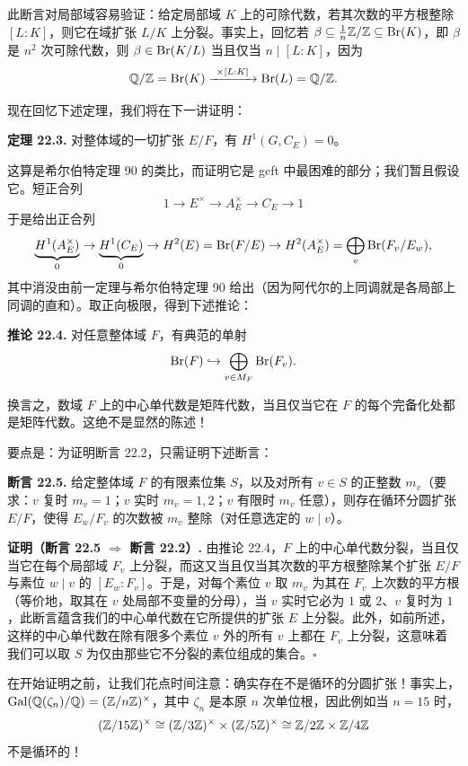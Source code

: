此断言对局部域容易验证：给定局部域 $K$ 上的可除代数，若其次数的平方根整除 $[L:K]$，则它在域扩张 $L/K$ 上分裂。事实上，回忆若 $\beta\subseteq\frac1n\mathbb{Z}/\mathbb{Z}\subseteq\operatorname{Br}(K)$，即 $\beta$ 是 $n^2$ 次可除代数，则 $\beta\in\operatorname{Br}(K/L)$ 当且仅当 $n\mid[L:K]$，因为
\[
\Q/\Z=\Br(K)\xrightarrow{\ \times[L:K]\ }\Br(L)=\Q/\Z.
\]

现在回忆下述定理，我们将在下一讲证明：

\textbf{定理 22.3.} 对整体域的一切扩张 $E/F$，有 $H^1(G,C_E)=0$。

这算是希尔伯特定理 90 的类比，而证明它是 gcft 中最困难的部分；我们暂且假设它。短正合列
\[
1\to E^\times\to A_E^\times\to C_E\to 1
\]
于是给出正合列
\[
\underbrace{H^1(A_E^\times)}_{0}\to\underbrace{H^1(C_E)}_{0}\to H^2(E)=\operatorname{Br}(F/E)\to H^2(A_E^\times)=\bigoplus_v\operatorname{Br}(F_v/E_w),
\]
其中消没由前一定理与希尔伯特定理 90 给出（因为阿代尔的上同调就是各局部上同调的直和）。取正向极限，得到下述推论：

\textbf{推论 22.4.} 对任意整体域 $F$，有典范的单射
\[
\operatorname{Br}(F)\hookrightarrow\bigoplus_{v\in M_F}\operatorname{Br}(F_v).
\]

换言之，数域 $F$ 上的中心单代数是矩阵代数，当且仅当它在 $F$ 的每个完备化处都是矩阵代数。这绝不是显然的陈述！

要点是：为证明断言 22.2，只需证明下述断言：

\textbf{断言 22.5.} 给定整体域 $F$ 的有限素位集 $S$，以及对所有 $v\in S$ 的正整数 $m_v$（要求：$v$ 复时 $m_v=1$；$v$ 实时 $m_v=1,2$；$v$ 有限时 $m_v$ 任意），则存在循环分圆扩张 $E/F$，使得 $E_w/F_v$ 的次数被 $m_v$ 整除（对任意选定的 $w\mid v$）。

\textbf{证明（断言 22.5 $\Rightarrow$ 断言 22.2）.} 由推论 22.4，$F$ 上的中心单代数分裂，当且仅当它在每个局部域 $F_v$ 上分裂，而这又当且仅当其次数的平方根整除某个扩张 $E/F$ 与素位 $w\mid v$ 的 $[E_w:F_v]$。于是，对每个素位 $v$ 取 $m_v$ 为其在 $F_v$ 上次数的平方根（等价地，取其在 $v$ 处局部不变量的分母），当 $v$ 实时它必为 $1$ 或 $2$、$v$ 复时为 $1$，此断言蕴含我们的中心单代数在它所提供的扩张 $E$ 上分裂。此外，如前所述，这样的中心单代数在除有限多个素位 $v$ 外的所有 $v$ 上都在 $F_v$ 上分裂，这意味着我们可以取 $S$ 为仅由那些它不分裂的素位组成的集合。\hfill$\square$

在开始证明之前，让我们花点时间注意：确实存在不是循环的分圆扩张！事实上，$\operatorname{Gal}(\mathbb{Q}(\zeta_n)/\mathbb{Q})=(\mathbb{Z}/n\mathbb{Z})^\times$，其中 $\zeta_n$ 是本原 $n$ 次单位根，因此例如当 $n=15$ 时，
\[
(\mathbb{Z}/15\mathbb{Z})^\times\cong(\mathbb{Z}/3\mathbb{Z})^\times\times(\mathbb{Z}/5\mathbb{Z})^\times\cong\mathbb{Z}/2\mathbb{Z}\times\mathbb{Z}/4\mathbb{Z}
\]
不是循环的！

